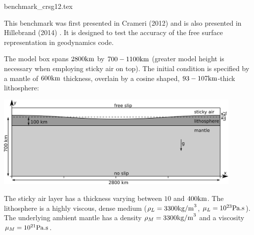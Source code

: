 \begin{flushright} {\tiny {\color{gray} benchmark\_crsg12.tex}} \end{flushright}

This benchmark was first presented in Crameri \etal (2012) \cite{crsg12} 
and is also presented in Hillebrand \etal (2014) \cite{hitg14}.
It is designed to test the accuracy of the free surface representation in geodynamics code.

The model box spans $2800{\rm km}$ by $700-1100{\rm km}$ 
(greater model height is necessary when employing sticky air on top). 
The initial condition is specified by a mantle of $600{\rm km}$ thickness, overlain by a cosine shaped, 
$93-107{\rm km}$-thick lithosphere:

\begin{center}
\includegraphics[width=12cm]{images/benchmark_crsg12/setup}
\end{center}

The sticky air layer has a thickness varying between $10$ and $400{\rm km}$. 
The lithosphere is a highly viscous, dense medium 
($\rho_L=3300{\rm kg/m}^3$, $\mu_L=10^{23} {\rm Pa.s}$). 
The underlying ambient mantle has a density $\rho_M =3300{\rm kg/m}^3$ and a viscosity $\mu_M =10^{21} {\rm Pa.s}$. 

